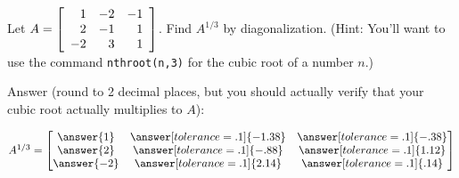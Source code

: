 \documentclass{ximera}
\author{Zack Reed}
\begin{document}

\begin{example}
  Let $A = \startmat{rrr}
    1 & -2 & -1 \\
    2 & -1 & 1 \\
    -2 & 3 & 1
  \stopmat$. Find $A^{1/3}$ by diagonalization. (Hint: You'll want to use the command \texttt{nthroot(n,3)} for the cubic root of a number $n$.)

  Answer (round to 2 decimal places, but you should actually verify that your cubic root actually multiplies to $A$):

  $A^{1/3}=\begin{bmatrix}
    \answer{1} & \answer[tolerance=.1]{-1.38} & \answer[tolerance=.1]{-.38}\\
    \answer{2} & \answer[tolerance=.1]{-.88} & \answer[tolerance=.1]{1.12}\\
    \answer{-2} & \answer[tolerance=.1]{2.14} & \answer[tolerance=.1]{.14}
  \end{bmatrix}$
\end{example}
\end{document}
